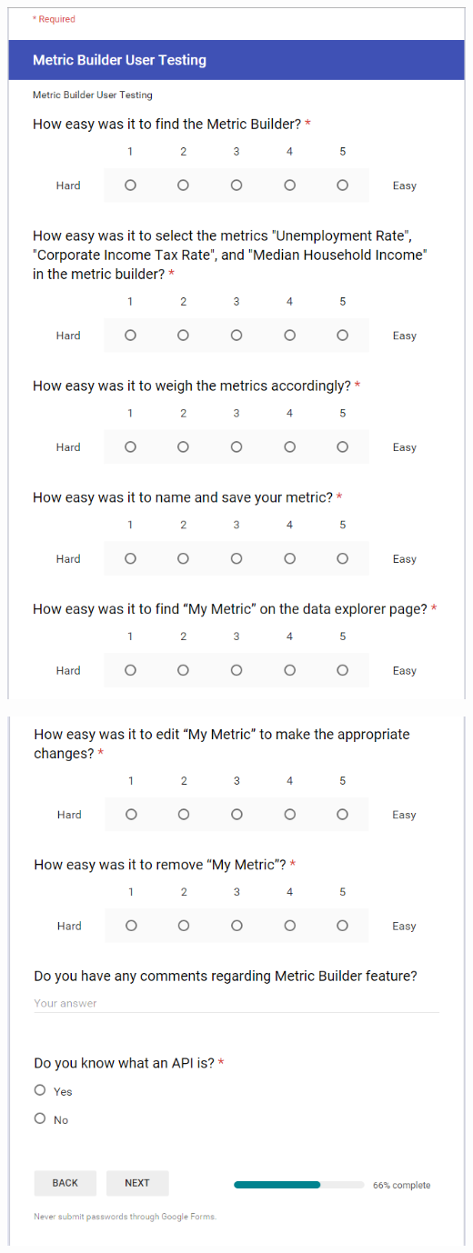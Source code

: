 \begin{center}
	\includegraphics[width=0.9\linewidth]{images/survey2}
\end{center}

\begin{center}
	\includegraphics[width=0.9\linewidth]{images/survey3}
\end{center}

